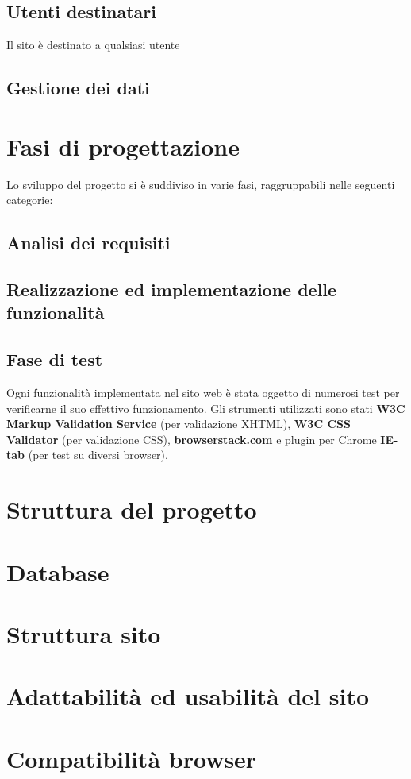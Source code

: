 \subsection{Utenti destinatari}

Il sito è destinato a qualsiasi utente 

\subsection{Gestione dei dati}


\section{Fasi di progettazione}

Lo sviluppo del progetto si è suddiviso in varie fasi, raggruppabili nelle seguenti categorie:

\subsection{Analisi dei requisiti}


\subsection{Realizzazione ed implementazione delle funzionalità}

\subsection{Fase di test}

Ogni funzionalità implementata nel sito web è stata oggetto di numerosi test per verificarne il suo effettivo funzionamento. Gli strumenti utilizzati sono stati \textbf{W3C Markup Validation Service} (per validazione XHTML), \textbf{W3C CSS Validator} (per validazione CSS), \textbf{browserstack.com} e plugin per Chrome \textbf{IE-tab} (per test su diversi browser).

\section{Struttura del progetto}


\section{Database}


\section{Struttura sito}


\section{Adattabilità ed usabilità del sito}


\section{Compatibilità browser}


